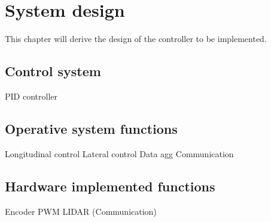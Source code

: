 \chapter{System design}
\label{sec:system_design}
This chapter will derive the design of the controller to be implemented.

\section{Control system}
PID controller

\section{Operative system functions}
Longitudinal control
Lateral control
Data agg
Communication

\section{Hardware implemented functions}
Encoder
PWM
LIDAR
(Communication)
